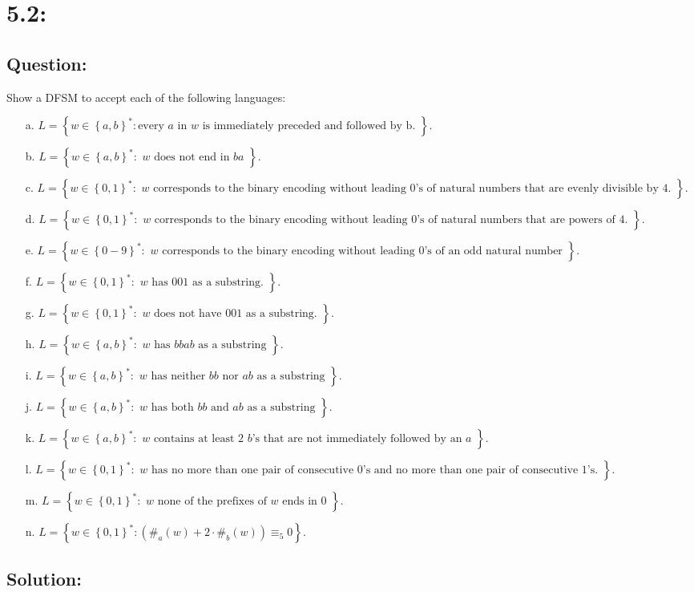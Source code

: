 \documentclass[11pt, oneside]{article}
\newcommand{\question}[3]{ 
  \section{#1:} 
  \subsection*{Question:} #2
  \subsection*{Solution:} #3 
}
\begin{document}
\question{5.2}
{
  Show a DFSM to accept each of the following languages:
  \begin{enumerate}
    \item[a.]
      $L = \left\{ w \in \left\{ a,b \right\}^*: 
      \text{
        every $a$ in $w$ is immediately preceded and followed by b.
      }\right\}$.
    \item[b.]
      $L = \left\{ w \in \left\{ a,b \right\}^*: 
      \text{
        $w$ does not end in $ba$
      }\right\}$.
    \item[c.]
      $L = \left\{ w \in \left\{ 0,1 \right\}^*: 
      \text{
        $w$ corresponds to the binary encoding without leading $0$'s of natural
        numbers that are evenly divisible by $4$.
      }\right\}$.
    \item[d.]
      $L = \left\{ w \in \left\{ 0,1 \right\}^*: 
      \text{
        $w$ corresponds to the binary encoding without leading $0$'s of natural
        numbers that are powers of $4$.
      }\right\}$.
    \item[e.]
      $L = \left\{ w \in \left\{ 0-9 \right\}^*: 
      \text{
        $w$ corresponds to the binary encoding without leading $0$'s of an odd
        natural number
      }\right\}$.
    \item[f.]
      $L = \left\{ w \in \left\{ 0,1 \right\}^*: 
      \text{
        $w$ has $001$ as a substring.
      }\right\}$.
    \item[g.]
      $L = \left\{ w \in \left\{ 0,1 \right\}^*: 
      \text{
        $w$ does not have $001$ as a substring.
      }\right\}$.
    \item[h.]
      $L = \left\{ w \in \left\{ a,b \right\}^*: 
      \text{
        $w$ has $bbab$ as a substring
      }\right\}$.
    \item[i.]
      $L = \left\{ w \in \left\{ a,b \right\}^*: 
      \text{
        $w$ has neither $bb$ nor $ab$ as a substring
      }\right\}$.
    \item[j.]
      $L = \left\{ w \in \left\{ a,b \right\}^*: 
      \text{
        $w$ has both $bb$ and $ab$ as a substring
      }\right\}$.
    \item[k.]
      $L = \left\{ w \in \left\{ a,b \right\}^*: 
      \text{
        $w$ contains at least 2 $b$'s that are not immediately followed by an
        $a$
      }\right\}$.
    \item[l.]
      $L = \left\{ w \in \left\{ 0,1 \right\}^*: 
      \text{
        $w$ has no more than one pair of consecutive $0$'s and no more than one
        pair of consecutive $1$'s.
      }\right\}$.
    \item[m.]
      $L = \left\{ w \in \left\{ 0,1 \right\}^*: 
      \text{
        $w$ none of the prefixes of $w$ ends in $0$
      }\right\}$.
    \item[n.]
      $L = \left\{ w \in \left\{ 0,1 \right\}^*: 
        (\#_a(w) + 2 \cdot \#_b(w)) \equiv_5 0
      \right\}$.
  \end{enumerate}
} 
\end{document}
